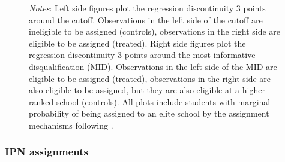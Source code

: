 \documentclass[oneside,11pt]{article}
\begin{document}
\begin{figure}[H]
\footnotesize
\textit{Notes}: Left side figures plot the regression discontinuity 3 points around the cutoff. Observations in the left side of the cutoff are ineligible to be assigned (controls), observations in the right side are eligible to be assigned (treated). Right side figures plot the regression discontinuity 3 points around the most informative disqualification (MID). Observations in the left side of the MID are eligible to be assigned (treated), observations in the right side are also eligible to be assigned, but they are also eligible at a higher ranked school (controls). All plots include students with marginal probability of being assigned to an elite school by the assignment mechanisms following \citet{abdulkadirouglu2022breaking}. 
\end{figure}

\subsubsection{IPN assignments}
\end{document}

